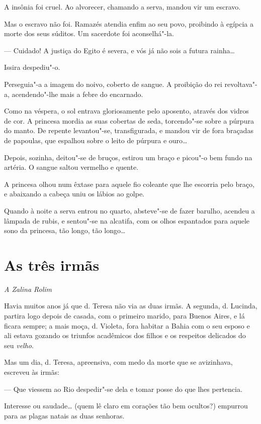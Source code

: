 A insônia foi cruel. Ao alvorecer, chamando a serva, mandou vir um
escravo.

Mas o escravo não foi. Ramazés atendia enfim ao seu povo, proibindo à
egípcia a morte dos seus súditos. Um sacerdote foi aconselhá"-la.

--- Cuidado! A justiça do Egito é severa, e vós já não sois a futura
rainha\ldots{}

Issira despediu"-o.

Perseguia"-a a imagem do noivo, coberto de sangue. A proibição do rei
revoltava"-a, acendendo"-lhe mais a febre do encarnado.

Como na véspera, o sol entrava gloriosamente pelo aposento, através dos
vidros de cor. A princesa mordia as suas cobertas de seda, torcendo"-se
sobre a púrpura do manto. De repente levantou"-se, transfigurada, e
mandou vir de fora braçadas de papoulas, que espalhou sobre o leito de
púrpura e ouro\ldots{}

Depois, sozinha, deitou"-se de bruços, estirou um braço e picou"-o bem
fundo na artéria. O sangue saltou vermelho e quente.

A princesa olhou num êxtase para aquele fio coleante que lhe escorria
pelo braço, e abaixando a cabeça uniu os lábios ao golpe.

Quando à noite a serva entrou no quarto, absteve"-se de fazer barulho,
acendeu a lâmpada de rubis, e sentou"-se na alcatifa, com os olhos
espantados para aquele sono da princesa, tão longo, tão longo\ldots{}

\chapter{As três irmãs}

\hfill{}\emph{A Zalina Rolim}

\bigskip

Havia muitos anos já que d. Teresa não via as duas irmãs. A segunda, d.
Lucinda, partira logo depois de casada, com o primeiro marido, para
Buenos Aires, e lá ficara sempre; a mais moça, d. Violeta, fora habitar
a Bahia com o seu esposo e ali estava gozando os triunfos acadêmicos dos
filhos e os respeitos delicados do seu \emph{velho}.

Mas um dia, d. Teresa, apreensiva, com medo da morte que se avizinhava,
escreveu às irmãs:

--- Que viessem ao Rio despedir"-se dela e tomar posse do que lhes
pertencia.

Interesse ou saudade\ldots{} (quem lê claro em corações tão bem ocultos?)
empurrou para as plagas natais as duas senhoras.

